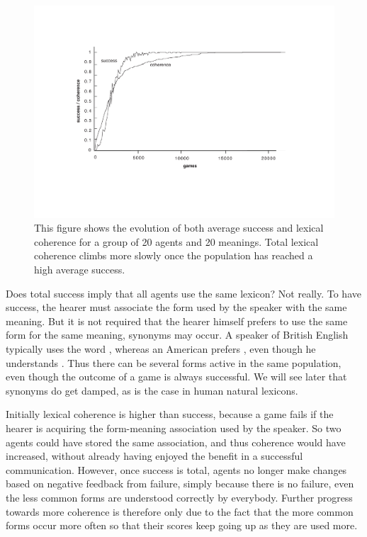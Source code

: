 \begin{figure}[htbp]
  \centerline{\includegraphics[width=\textwidth]{chap5/figs/suc-coh.pdf}}
\caption{\label{suc-coh}This figure shows the evolution of both average
success and lexical coherence for a group of 20 agents and 20 
meanings. Total lexical coherence climbs more slowly
once the 
population has reached a high average success.}
\end{figure}
Does total success imply that all agents use the 
same lexicon? Not really. To have success, the hearer
must associate the form used by the speaker
with the same meaning. But it is not required that the
hearer himself prefers to use the same form for the same meaning, 
synonyms may occur.  
A speaker of British English typically uses the word , 
whereas an American prefers , even though he
understands . Thus there can 
be several forms active in the same population, even though 
the outcome of a game is always successful. We will see 
later that synonyms do get damped, as is the case in 
human natural lexicons. 

Initially lexical coherence is higher than success, because a game 
fails if the hearer is acquiring the form-meaning association
used by the speaker. So two agents could have stored the same association, 
and thus coherence would have increased, without already having enjoyed the benefit
in a successful communication. However, once success
is total, agents no longer make changes based on negative feedback
from failure, simply because there is no failure,  
even the less common forms are understood correctly 
by everybody. Further progress towards more coherence
is therefore only due to the 
fact that the more common forms occur more often so that
their scores keep going up as they are used more. 

